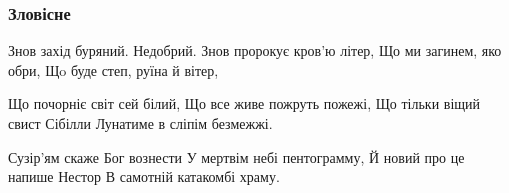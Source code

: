  
 
 

\subsubsection{Зловісне}

Знов захід буряний. Недобрий.
Знов пророкує кров’ю літер,
Що ми загинем, яко обри,
Щo буде степ, руїна й вітер,

Що почорніє світ сей білий,
Що все живе пожруть пожежі,
Що тільки віщий свист Сібілли
Лунатиме в сліпім безмежжі.

Сузір’ям скаже Бог вознести
У мертвім небі пентограмму,
Й новий про це напише Нестор
В самотній катакомбі храму.

